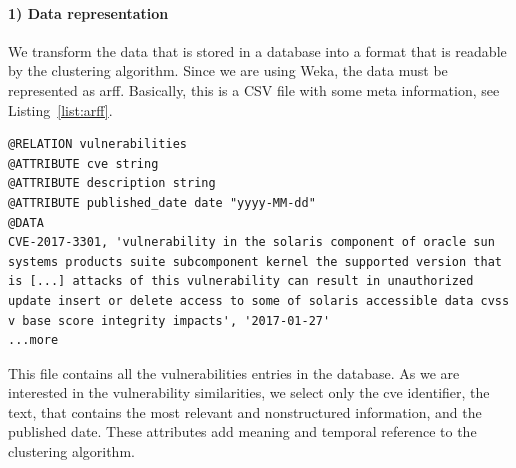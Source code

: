 \paragraph{1) Data representation}
We transform the data that is stored in a database into a format that is readable by the clustering algorithm. 
Since we are using Weka, the data must be represented as \gls{arff}. 
Basically, this is a CSV file with some meta information, see Listing~\ref{list:arff}.

\begin{lstlisting}[style=mystyle,caption=ARFF file describing a vulnerability.,label=list:arff]
@RELATION vulnerabilities
@ATTRIBUTE cve string
@ATTRIBUTE description string
@ATTRIBUTE published_date date "yyyy-MM-dd"
@DATA
CVE-2017-3301, 'vulnerability in the solaris component of oracle sun systems products suite subcomponent kernel the supported version that is [...] attacks of this vulnerability can result in unauthorized update insert or delete access to some of solaris accessible data cvss v base score integrity impacts', '2017-01-27'
...more
\end{lstlisting}


This file contains all the vulnerabilities entries in the database. 
As we are interested in the vulnerability similarities, we select only the \gls{cve} identifier, the text, that contains the most relevant and nonstructured information, and the published date.
These attributes add meaning and temporal reference to the clustering algorithm.


